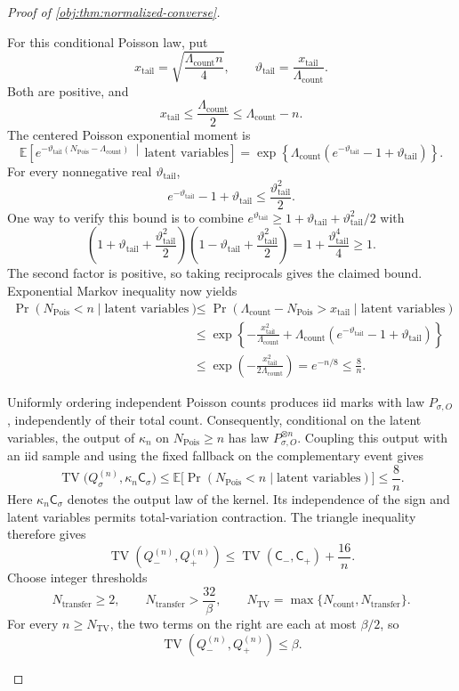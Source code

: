 \begin{proof}[Proof of \cref{obj:thm:normalized-converse}]
\begin{enumerate}
For this conditional Poisson law, put
\[
x_{\mathrm{tail}}
=\sqrt{\frac{\Lambda_{\mathrm{count}}n}{4}},
\qquad
\vartheta_{\mathrm{tail}}
=\frac{x_{\mathrm{tail}}}{\Lambda_{\mathrm{count}}}.
\]
Both are positive, and
\[
x_{\mathrm{tail}}\le\frac{\Lambda_{\mathrm{count}}}{2}
\le\Lambda_{\mathrm{count}}-n.
\]
The centered Poisson exponential moment is
\[
\mathbb E\!\left[
e^{-\vartheta_{\mathrm{tail}}
(N_{\mathrm{Pois}}-\Lambda_{\mathrm{count}})}
\,\middle|\,\text{latent variables}\right]
=
\exp\!\left\{
\Lambda_{\mathrm{count}}
(e^{-\vartheta_{\mathrm{tail}}}-1+\vartheta_{\mathrm{tail}})
\right\}.
\]
For every nonnegative real \(\vartheta_{\mathrm{tail}}\),
\[
e^{-\vartheta_{\mathrm{tail}}}-1+\vartheta_{\mathrm{tail}}
\le\frac{\vartheta_{\mathrm{tail}}^2}{2}.
\]
One way to verify this bound is to combine
\(e^{\vartheta_{\mathrm{tail}}}\ge
1+\vartheta_{\mathrm{tail}}+\vartheta_{\mathrm{tail}}^2/2\)
with
\[
\left(1+\vartheta_{\mathrm{tail}}
+\frac{\vartheta_{\mathrm{tail}}^2}{2}\right)
\left(1-\vartheta_{\mathrm{tail}}
+\frac{\vartheta_{\mathrm{tail}}^2}{2}\right)
=1+\frac{\vartheta_{\mathrm{tail}}^4}{4}\ge1.
\]
The second factor is positive, so taking reciprocals gives the claimed bound. Exponential Markov inequality now yields
\[
\begin{aligned}
\Pr(N_{\mathrm{Pois}}<n\mid\text{latent variables})
&\le
\Pr(\Lambda_{\mathrm{count}}-N_{\mathrm{Pois}}>
x_{\mathrm{tail}}\mid\text{latent variables})\\
&\le
\exp\!\left\{
-\frac{x_{\mathrm{tail}}^2}{\Lambda_{\mathrm{count}}}
+\Lambda_{\mathrm{count}}
(e^{-\vartheta_{\mathrm{tail}}}-1+\vartheta_{\mathrm{tail}})
\right\}\\
&\le
\exp\!\left(-\frac{x_{\mathrm{tail}}^2}
                   {2\Lambda_{\mathrm{count}}}\right)
=e^{-n/8}
\le\frac8n.
\end{aligned}
\]

Uniformly ordering independent Poisson counts produces iid marks with law
\(P_{\sigma,O}\), independently of their total count. Consequently,
conditional on the latent variables, the output of
\(\kappa_n\) on \(N_{\mathrm{Pois}}\ge n\) has law
\(P_{\sigma,O}^{\otimes n}\). Coupling this output with an iid sample and using the fixed fallback on the complementary event gives
\[
\operatorname{TV}\bigl(Q_\sigma^{(n)},\kappa_n\mathsf C_\sigma\bigr)
\le
\mathbb E\bigl[
\Pr(N_{\mathrm{Pois}}<n\mid\text{latent variables})\bigr]
\le\frac8n.
\]
Here \(\kappa_n\mathsf C_\sigma\) denotes the output law of the kernel.
Its independence of the sign and latent variables permits total-variation contraction. The triangle inequality therefore gives
\[
\operatorname{TV}(Q_-^{(n)},Q_+^{(n)})
\le
\operatorname{TV}(\mathsf C_-,\mathsf C_+)+\frac{16}{n}.
\]
Choose integer thresholds
\[
N_{\mathrm{transfer}}\ge2,
\qquad
N_{\mathrm{transfer}}>\frac{32}{\beta},
\qquad
N_{\mathrm{TV}}
=\max\{N_{\mathrm{count}},N_{\mathrm{transfer}}\}.
\]
For every \(n\ge N_{\mathrm{TV}}\), the two terms on the right are each at most \(\beta/2\), so
\[
\operatorname{TV}(Q_-^{(n)},Q_+^{(n)})\le\beta.
\]


\end{enumerate}
\end{proof}
